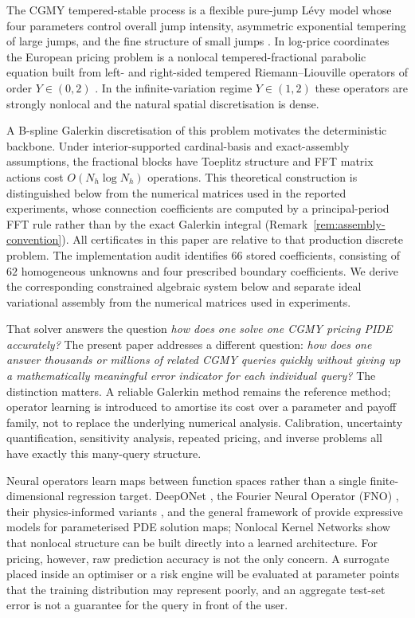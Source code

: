 \documentclass[11pt]{amsart}
\theoremstyle{remark}
\begin{document}
The CGMY tempered-stable process is a flexible pure-jump L\'evy model whose
four parameters control overall jump intensity, asymmetric exponential
tempering of large jumps, and the fine structure of small jumps
\cite{CarrGemanMadanYor2002}.  In log-price coordinates the European pricing
problem is a nonlocal tempered-fractional parabolic equation built from left-
and right-sided tempered Riemann--Liouville operators of order $Y\in(0,2)$
\cite{CarteadelCastilloNegrete2007}.  In the infinite-variation regime
$Y\in(1,2)$ these operators are strongly nonlocal and the natural spatial
discretisation is dense.

A B-spline Galerkin discretisation of this problem
\cite{DamircheliCGMY2026} motivates the deterministic backbone. Under
interior-supported cardinal-basis and exact-assembly assumptions, the
fractional blocks have Toeplitz structure and FFT matrix actions cost
$O(N_h\log N_h)$ operations. This theoretical construction is distinguished
below from the numerical matrices used in the reported experiments, whose
connection coefficients are computed by a principal-period FFT rule rather
than by the exact Galerkin integral (Remark~\ref{rem:assembly-convention}).
All certificates in this paper are relative to that production discrete problem. The implementation audit identifies $66$ stored coefficients, consisting of
$62$ homogeneous unknowns and four prescribed boundary coefficients.
We derive the corresponding constrained algebraic system below and separate
ideal variational assembly from the numerical matrices used in experiments.

That solver answers the question \emph{how does one solve one CGMY pricing
PIDE accurately?}  The present paper addresses a different question:
\emph{how does one answer thousands or millions of related CGMY queries
quickly without giving up a mathematically meaningful error indicator for each
individual query?}  The distinction matters.  A reliable Galerkin method
remains the reference method; operator learning is introduced to amortise its
cost over a parameter and payoff family, not to replace the underlying
numerical analysis.  Calibration, uncertainty quantification, sensitivity
analysis, repeated pricing, and inverse problems all have exactly this
many-query structure.

Neural operators learn maps between function spaces rather than a single
finite-dimensional regression target.  DeepONet
\cite{LuJinPangZhangKarniadakis2021}, the Fourier Neural Operator (FNO)
\cite{LiKovachkiEtAl2021}, their physics-informed variants
\cite{LiZhengEtAl2021}, and the general framework of
\cite{KovachkiEtAl2023} provide expressive models for parameterised PDE
solution maps; Nonlocal Kernel Networks \cite{YouYuDEliaGaoSilling2022} show
that nonlocal structure can be built directly into a learned architecture.
For pricing, however, raw prediction accuracy is not the only concern.  A
surrogate placed inside an optimiser or a risk engine will be evaluated at
parameter points that the training distribution may represent poorly, and an
aggregate test-set error is not a guarantee for the query in front of the
user.
\end{document}
